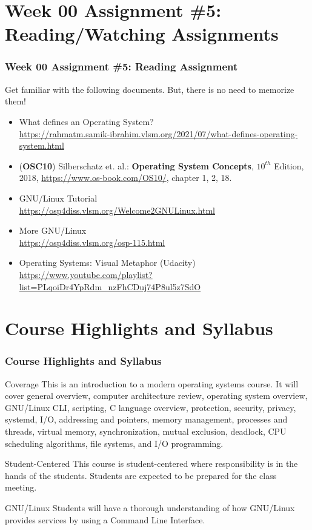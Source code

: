\documentclass[xcolor=table, notheorems, hyperref={pdfpagelabels=false}]{beamer}
\begin{document}
\section{Week 00 Assignment \#5: Reading/Watching Assignments}
\begin{frame}[fragile]
\frametitle{Week 00 Assignment \#5: Reading Assignment}
Get familiar with the following documents.
But, there is no need to memorize them!
\begin{itemize}
\item What defines an Operating System?\\ \url{https://rahmatm.samik-ibrahim.vlsm.org/2021/07/what-defines-operating-system.html}
\item (\textbf{OSC10}) Silberschatz et. al.:
      \textbf{Operating System Concepts}, $10^{th}$ Edition, 2018,
      \url{https://www.os-book.com/OS10/}, chapter 1, 2, 18.
\item GNU/Linux Tutorial\\ \url{https://osp4diss.vlsm.org/Welcome2GNULinux.html}
\item More GNU/Linux\\ \url{https://osp4diss.vlsm.org/osp-115.html}
\item Operating Systems: Visual Metaphor (Udacity)\\ \url{https://www.youtube.com/playlist?list=PLqoiDr4YpRdm_nzFhCDuj74P8ul5z7SdO}
\end{itemize}
\end{frame}

\section{Course Highlights and Syllabus} 
\begin{frame}
\frametitle{Course Highlights and Syllabus}
\begin{block}{Coverage}
This is an introduction to a modern operating systems course. 
It will cover
general overview,
computer architecture review,
operating system overview,
GNU/Linux CLI,
scripting,
C language overview,
protection,
security,
privacy,
systemd,
I/O,
addressing and pointers,
memory management, 
processes and threads, 
virtual memory,
synchronization,
mutual exclusion, 
deadlock, 
CPU scheduling algorithms, 
file systems,
and
I/O programming.
\end{block}

\begin{block}{Student-Centered}
This course is student-centered where responsibility is
in the hands of the students. Students are expected to 
be prepared for the class meeting.
\end{block}

\begin{block}{GNU/Linux}
Students will have a thorough understanding of how GNU/Linux 
provides services by using a Command Line Interface.
\end{block}

\end{frame}
\end{document}
